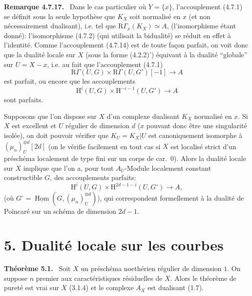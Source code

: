 \documentclass[11pt]{article}
\newenvironment{statement}[1]{\par\medskip\noindent\textbf{#1.}\ }{\par\medskip}
\renewcommand{\H}{\mathrm{H}}
\DeclareMathOperator{\Hom}{Hom}
\newcommand{\R}{\mathrm{R}}\newcommand{\RHomCore}{\mathrm{RHom}}
\providecommand{\uHom}{\underline{\Hom}}
\providecommand{\Hom}{\operatorname{Hom}}
\providecommand{\R}{\mathrm R}
\providecommand{\Hom}{\operatorname{Hom}}
\begin{document}
\begin{statement}{Remarque 4.7.17}
Dans le cas particulier où $Y=\{x\}$, l'accouplement (4.7.1) se définit sous la seule hypothèse que $K_X$ soit normalisé en $x$ (et non nécessairement dualisant), i.e. tel que $\R\Gamma_x(K_X)\simeq A$, (l'isomorphisme étant donné): l'isomorphisme (4.7.2) (qui utilisait la bidualité) se réduit en effet à l'identité. Comme l'accouplement (4.7.14) est de toute façon parfait, on voit donc que la dualité locale sur $X$ (sous la forme (4.2.2)') équivaut à la dualité ``globale'' sur $U=X-x$, i.e. au fait que l'accouplement (4.7.1)
\[
\R\Gamma(U,G)\times\R\Gamma(U,G')[-1]\longrightarrow A
\]
est parfait, ou encore que les accouplements
\[
\H^i(U,G)\times\H^{-i-1}(U,G')\longrightarrow A
\]
sont parfaits.

Supposons que l'on dispose sur $X$ d'un complexe dualisant $K_X$ normalisé en $x$. Si $X$ est excellent et $U$ régulier de dimension $d$ ($x$ pouvant donc être une singularité isolée), on doit pouvoir vérifier que $K_U=K_X|U$ est canoniquement isomorphe à $(\mu_n)_U^{\otimes d}[2d]$ (on le vérifie facilement en tout cas si $X$ est localisé strict d'un préschéma localement de type fini sur un corps de car.~0). Alors la dualité locale sur $X$ implique que l'on a, pour tout $A_U$-Module localement constant constructible $G$, des accouplements parfaits:
\[
\H^i(U,G)\times\H^{2d-1-i}(U,G^\circ)\longrightarrow A,
\]
(où $G^\circ=\uHom(G,(\mu_n)_U^{\otimes d})$), qui correspondent formellement à la dualité de Poincaré sur un schéma de dimension $2d-1$.
\end{statement}

\section*{5. Dualité locale sur les courbes}

\begin{statement}{Théorème 5.1}
Soit $X$ un préschéma noethérien régulier de dimension $1$. On suppose $n$ premier aux caractéristiques résiduelles de $X$. Alors le théorème de pureté est vrai sur $X$ (3.1.4) et le complexe $A_X$ est dualisant (1.7).
\end{statement}
\end{document}

